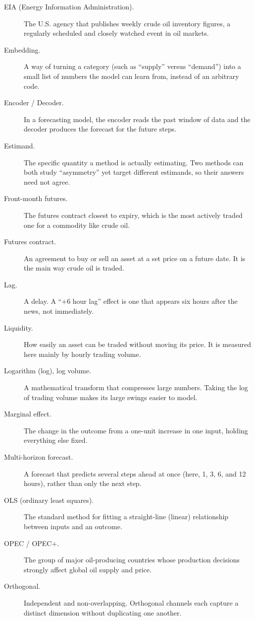 \begin{description}
  \item[EIA (Energy Information Administration).] The U.S. agency that publishes weekly crude oil inventory figures, a regularly scheduled and closely watched event in oil markets.
  \item[Embedding.] A way of turning a category (such as ``supply'' versus ``demand'') into a small list of numbers the model can learn from, instead of an arbitrary code.
  \item[Encoder / Decoder.] In a forecasting model, the encoder reads the past window of data and the decoder produces the forecast for the future steps.
  \item[Estimand.] The specific quantity a method is actually estimating. Two methods can both study ``asymmetry'' yet target different estimands, so their answers need not agree.
  \item[Front-month futures.] The futures contract closest to expiry, which is the most actively traded one for a commodity like crude oil.
  \item[Futures contract.] An agreement to buy or sell an asset at a set price on a future date. It is the main way crude oil is traded.
  \item[Lag.] A delay. A ``$+6$ hour lag'' effect is one that appears six hours after the news, not immediately.
  \item[Liquidity.] How easily an asset can be traded without moving its price. It is measured here mainly by hourly trading volume.
  \item[Logarithm (log), log volume.] A mathematical transform that compresses large numbers. Taking the log of trading volume makes its large swings easier to model.
  \item[Marginal effect.] The change in the outcome from a one-unit increase in one input, holding everything else fixed.
  \item[Multi-horizon forecast.] A forecast that predicts several steps ahead at once (here, 1, 3, 6, and 12 hours), rather than only the next step.
  \item[OLS (ordinary least squares).] The standard method for fitting a straight-line (linear) relationship between inputs and an outcome.
  \item[OPEC / OPEC+.] The group of major oil-producing countries whose production decisions strongly affect global oil supply and price.
  \item[Orthogonal.] Independent and non-overlapping. Orthogonal channels each capture a distinct dimension without duplicating one another.

\end{description}
